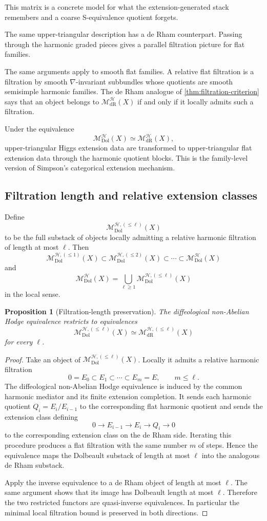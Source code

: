 \documentclass[11pt,reqno]{amsart}
\newtheorem{proposition}[theorem]{Proposition}
\theoremstyle{definition}
\theoremstyle{remark}
\newcommand{\cH}{\mathcal H}
\newcommand{\Dol}{\mathrm{Dol}}
\newcommand{\dR}{\mathrm{dR}}
\newcommand{\MHDol}{\mathscr M^{\cH}_{\Dol}}
\newcommand{\MHdR}{\mathscr M^{\cH}_{\dR}}
\begin{document}
This matrix is a concrete model for what the extension-generated stack remembers and a coarse S-equivalence quotient forgets.


The same upper-triangular description has a de Rham counterpart.  Passing through the harmonic graded pieces gives a parallel filtration picture for flat families.


The same arguments apply to smooth flat families.  A relative flat filtration is a filtration by smooth $\nabla$-invariant subbundles whose quotients are smooth semisimple harmonic families.  The de Rham analogue of \cref{thm:filtration-criterion} says that an object belongs to $\MHdR(X)$ if and only if it locally admits such a filtration.

Under the equivalence
\[
  \MHDol(X)\simeq\MHdR(X),
\]
upper-triangular Higgs extension data are transformed to upper-triangular flat extension data through the harmonic quotient blocks.  This is the family-level version of Simpson's categorical extension mechanism.

\subsection{Filtration length and relative extension classes}

Define
\[
  \mathscr M_{\Dol}^{\cH,(\le\ell)}(X)
\]
to be the full substack of objects locally admitting a relative harmonic filtration of length at most $\ell$.  Then
\[
  \mathscr M_{\Dol}^{\cH,(\le1)}(X)
  \subset
  \mathscr M_{\Dol}^{\cH,(\le2)}(X)
  \subset\cdots\subset
  \MHDol(X)
\]
and
\[
  \MHDol(X)=\bigcup_{\ell\ge1}\mathscr M_{\Dol}^{\cH,(\le\ell)}(X)
\]
in the local sense.

\begin{proposition}[Filtration-length preservation]\label{prop:length-preservation}
The diffeological non-Abelian Hodge equivalence restricts to equivalences
\[
  \mathscr M_{\Dol}^{\cH,(\le\ell)}(X)
  \simeq
  \mathscr M_{\dR}^{\cH,(\le\ell)}(X)
\]
for every $\ell$.
\end{proposition}

\begin{proof}
Take an object of $\mathscr M_{\Dol}^{\cH,(\le\ell)}(X)$.  Locally it admits a relative harmonic filtration
\[
  0=E_0\subset E_1\subset\cdots\subset E_m=E,
  \qquad m\le\ell.
\]
The diffeological non-Abelian Hodge equivalence is induced by the common harmonic mediator and its finite extension completion.  It sends each harmonic quotient $Q_i=E_i/E_{i-1}$ to the corresponding flat harmonic quotient and sends the extension class defining
\[
  0\to E_{i-1}\to E_i\to Q_i\to0
\]
to the corresponding extension class on the de Rham side.  Iterating this procedure produces a flat filtration with the same number $m$ of steps.  Hence the equivalence maps the Dolbeault substack of length at most $\ell$ into the analogous de Rham substack.

Apply the inverse equivalence to a de Rham object of length at most $\ell$.  The same argument shows that its image has Dolbeault length at most $\ell$.  Therefore the two restricted functors are quasi-inverse equivalences.  In particular the minimal local filtration bound is preserved in both directions.
\end{proof}
\end{document}
